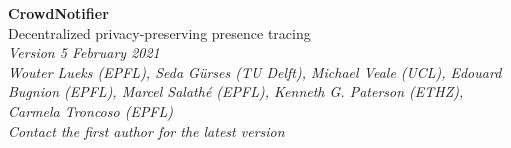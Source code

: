 \documentclass[a4paper,11pt]{article}
\begin{document}
\begin{center}
  \color{cnblue}
  \fontsize{18pt}{27pt}\selectfont
  {\bf\textsf{CrowdNotifier}}\\
  \fontsize{15pt}{22pt}\selectfont
  Decentralized privacy-preserving presence tracing\\
  \fontsize{11pt}{18pt}\selectfont
  \textit{Version 5 February 2021}\\[11pt]
  \fontsize{12pt}{18pt}\selectfont
  \textit{Wouter Lueks (EPFL), Seda Gürses (TU Delft), Michael Veale
    (UCL), Edouard Bugnion (EPFL), Marcel Salathé (EPFL), Kenneth G. Paterson (ETHZ), Carmela Troncoso (EPFL)}\\[11pt]
  \fontsize{11pt}{15pt}\selectfont
  \textit{Contact the first author for the latest version}\\[12pt]
\end{center}

\thispagestyle{plain}
\pagestyle{plain}



\newpage
\tableofcontents

\newpage


\newpage










\appendix

\end{document}
